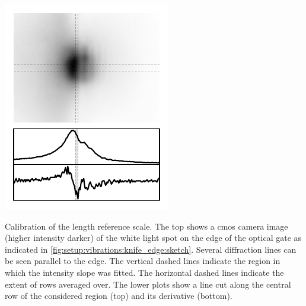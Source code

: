 \begin{marginfigure}[*-6]
    \centering
    \includegraphics{img/pdf/setup/knife_edge}
    \caption[]{
        Calibration of the length reference scale.
        The top shows a \acrshort{cmos} camera image (higher intensity darker) of the white light spot on the edge of the optical gate as indicated in \cref{fig:setup:vibrations:knife_edge:sketch}.
        Several diffraction lines can be seen parallel to the edge.
        The vertical dashed lines indicate the region in which the intensity slope was fitted.
        The horizontal dashed lines indicate the extent of rows averaged over.
        The lower plots show a line cut along the central row of the considered region (top) and its derivative (bottom).
    }
    \label{fig:setup:vibrations:calibration:length_scale}
\end{marginfigure}


